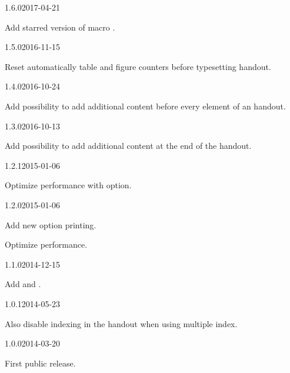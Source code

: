\documentclass{ltxdockit}[2011/03/25]
\begin{document}
\begin{changelog}
\begin{release}{1.6.0}{2017-04-21}
\item Add starred version of  macro . 
\end{release}

\begin{release}{1.5.0}{2016-11-15}
\item Reset automatically table and figure counters before typesetting handout.
\end{release}

\begin{release}{1.4.0}{2016-10-24}
\item Add possibility to add additional content before every element of an handout.
\end{release}

\begin{release}{1.3.0}{2016-10-13}
\item Add possibility to add additional content at the end of the handout. 
\end{release}

\begin{release}{1.2.1}{2015-01-06}
\item Optimize performance with  option.
\end{release}

\begin{release}{1.2.0}{2015-01-06}
\item Add new option printing. 
\item Optimize performance.
\end{release}

\begin{release}{1.1.0}{2014-12-15}
\item Add  and . 
\end{release}

\begin{release}{1.0.1}{2014-05-23}
\item Also disable indexing in the handout when using multiple index.
\end{release}

\begin{release}{1.0.0}{2014-03-20}
\item First public release.
\end{release}
\end{changelog}
\end{document}
